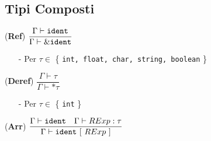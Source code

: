 \documentclass[12pt]{article}
\begin{document}
\subsection*{Tipi Composti}

\begin{center}
\noindent(\textbf{Ref})
$\dfrac{\Gamma \vdash \texttt{\texttt{ident}}}{\Gamma \vdash \text{\&} \texttt{\texttt{ident}}}$\\[0.1in]
\begin{itemize}
\item[-] Per $\tau \in$ \{ \texttt{int, float, char, string, boolean} \}
\end{itemize}
\noindent(\textbf{Deref})
$\dfrac{\Gamma \vdash \tau}{\Gamma \vdash \text{*} \tau}$\\[0.1in]
\begin{itemize}
\item[-] Per $\tau \in$ \{ \texttt{int} \}
\end{itemize}
\noindent(\textbf{Arr})
$\dfrac{\Gamma \vdash \texttt{\texttt{ident}}\ \ \ \Gamma \vdash RExp:\tau}{\Gamma \vdash \texttt{ident}\ [\ RExp\ ]}$\\[0.1in]
\end{center}
\end{document}
